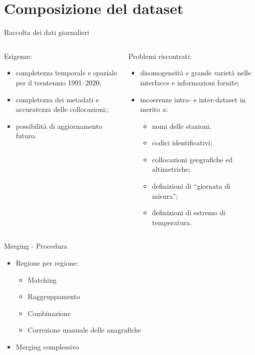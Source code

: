
\section{Composizione del dataset}
\begin{frame}{Raccolta dei dati giornalieri}
  \begin{columns}
    \begin{column}{0.45\textwidth}
      Esigenze:
      \begin{itemize}
        \item completezza temporale e spaziale per il trentennio 1991--2020;
        \item completezza dei metadati e accuratezza delle collocazioni;;
        \item possibilità di aggiornamento futuro.
      \end{itemize}
    \end{column}
    \begin{column}{0.55\textwidth}
      Problemi riscontrati:
      \begin{itemize}
        \item disomogeneità e grande varietà nelle interfacce e informazioni fornite;
        \item incoerenze intra- e inter-dataset in merito a:
          \begin{itemize}
            \item nomi delle stazioni;
            \item codici identificativi;
            \item collocazioni geografiche ed altimetriche;
            \item definizioni di ``giornata di misura'';
            \item definizioni di estremo di temperatura.
          \end{itemize}
      \end{itemize}
    \end{column}
  \end{columns}

\end{frame}

\begin{frame}{Merging - Procedura}
  \begin{itemize}
    \item Regione per regione:
      \begin{itemize}
        \item Matching
        \item Raggruppamento
        \item Combinazione
        \item Correzione manuale delle anagrafiche
      \end{itemize}
    \item Merging complessivo
  \end{itemize}
\end{frame}

